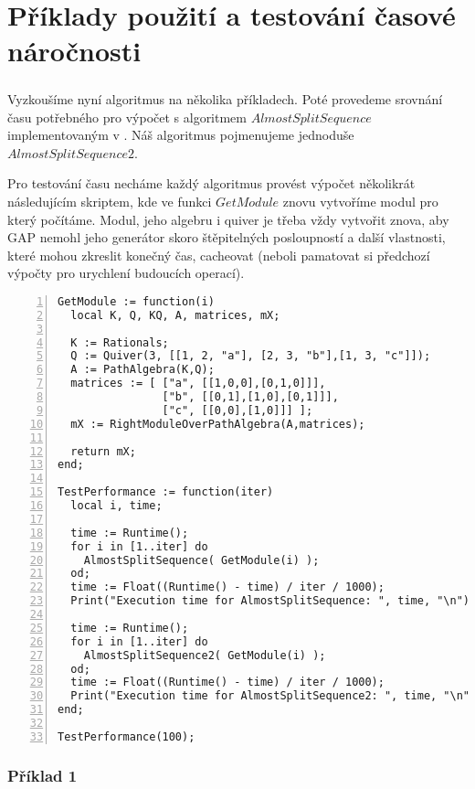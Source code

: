 
\chapter{Příklady použití a testování časové náročnosti} 

  \paragraph{ } Vyzkoušíme nyní algoritmus na několika příkladech. Poté provedeme srovnání 
  času potřebného pro výpočet s algoritmem $AlmostSplitSequence$ implementovaným v \cite{QPA}.
  Náš algoritmus pojmenujeme jednoduše $AlmostSplitSequence2$. 
  
  Pro testování 
  času necháme každý algoritmus provést výpočet několikrát následujícím 
  skriptem, kde ve funkci $GetModule$ znovu vytvoříme modul pro který počítáme. 
  Modul, jeho algebru i quiver je 
  třeba vždy vytvořit znova, aby GAP nemohl jeho generátor skoro štěpitelných 
  posloupností a další vlastnosti, které mohou zkreslit konečný čas, cacheovat (neboli pamatovat si předchozí 
  výpočty pro urychlení budoucích operací).
  \begin{Verbatim}[frame=single,numbers=left]
GetModule := function(i)
  local K, Q, KQ, A, matrices, mX;

  K := Rationals;
  Q := Quiver(3, [[1, 2, "a"], [2, 3, "b"],[1, 3, "c"]]);
  A := PathAlgebra(K,Q);
  matrices := [ ["a", [[1,0,0],[0,1,0]]], 
                ["b", [[0,1],[1,0],[0,1]]], 
                ["c", [[0,0],[1,0]]] ];
  mX := RightModuleOverPathAlgebra(A,matrices);

  return mX;
end;

TestPerformance := function(iter)
  local i, time;

  time := Runtime();
  for i in [1..iter] do
    AlmostSplitSequence( GetModule(i) );
  od;
  time := Float((Runtime() - time) / iter / 1000);
  Print("Execution time for AlmostSplitSequence: ", time, "\n");

  time := Runtime();
  for i in [1..iter] do
    AlmostSplitSequence2( GetModule(i) );
  od;
  time := Float((Runtime() - time) / iter / 1000);
  Print("Execution time for AlmostSplitSequence2: ", time, "\n");
end;

TestPerformance(100);
  \end{Verbatim} 
  
      \subsection*{Příklad 1}
